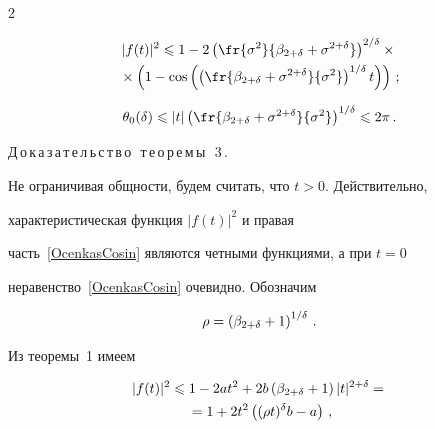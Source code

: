 \begin{multicols}{2}
\noindent

\begin{multline*}

|f(t)|^2\le1- 2

\left(\fr{\sigma^2}{\beta_{2+\d}+\sigma^{2+\d}}\right)^{2/\d}\times{}\\

{}\times

\left(1-\cos\left(\left(\fr{\beta_{2+\d}+

\sigma^{2+\d}}{\sigma^2}\right)^{1/\d} t\right)\right)\,;

\end{multline*}

\vspace*{-6pt}



\noindent

$$

\theta_0(\d)\le

|t|\left(\fr{\beta_{2+\d}+\sigma^{2+\d}}{\sigma^2}\right)^{1/{\d}}

 \le2\pi\,.

$$



\medskip



\noindent

Д\,о\,к\,а\,з\,а\,т\,е\,л\,ь\,с\,т\,в\,о\,\ т\,е\,о\,р\,е\,м\,ы\,\ 3\,.

Не ограничивая общности, будем считать, что $t>0$. Действительно,

характеристическая функция $|f(t)|^2$ и правая

часть~\eqref{OcenkasCosin} являются четными функциями, а при $t=0$

неравенство~\eqref{OcenkasCosin} очевидно. Обозначим

$$

\rho=\left(\beta_{2+\d}+1\right)^{1/\d}\,.

$$

Из теоремы~1 имеем

\begin{multline}

\label{|f(t)|^2<=a+b_bez_alpha}

|f(t)|^2\le 1-2at^2+2b

\left(\beta_{2+\d}+1\right)|t|^{2+\d}={}\\

{}=

1+2t^2\left((\rho t)^\d

b-a\right)\,,


\end{multline}
\end{multicols}
